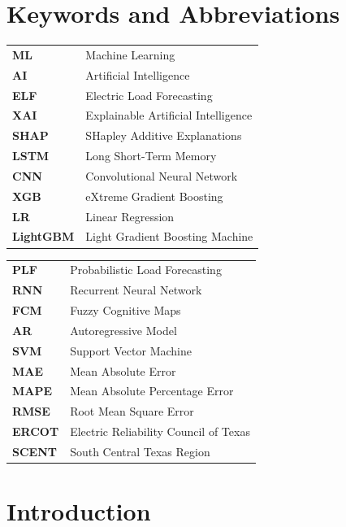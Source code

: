 \documentclass{ifacconf}
\begin{document}
\section*{Keywords and Abbreviations}
\begin{tcolorbox}[colback=white!100!gray, colframe=black, title=Keywords and Abbreviations, width=0.45\textwidth]
\footnotesize
\begin{tabular}{ll}
\textbf{ML} & Machine Learning \\
\textbf{AI} & Artificial Intelligence \\
\textbf{ELF} & Electric Load Forecasting \\
\textbf{XAI} & Explainable Artificial Intelligence \\
\textbf{SHAP} & SHapley Additive Explanations \\
\textbf{LSTM} & Long Short-Term Memory \\
\textbf{CNN} & Convolutional Neural Network \\
\textbf{XGB} & eXtreme Gradient Boosting \\
\textbf{LR} & Linear Regression \\
\textbf{LightGBM} & Light Gradient Boosting Machine \\
\end{tabular}
\hfill
\begin{tabular}{ll}
\textbf{PLF} & Probabilistic Load Forecasting \\
\textbf{RNN} & Recurrent Neural Network \\
\textbf{FCM} & Fuzzy Cognitive Maps \\
\textbf{AR} & Autoregressive Model \\
\textbf{SVM} & Support Vector Machine \\
\textbf{MAE} & Mean Absolute Error \\
\textbf{MAPE} & Mean Absolute Percentage Error \\
\textbf{RMSE} & Root Mean Square Error \\
\textbf{ERCOT} & Electric Reliability Council of Texas \\
\textbf{SCENT} & South Central Texas Region \\
\end{tabular}
\end{tcolorbox}


\section{Introduction}
\end{document}
